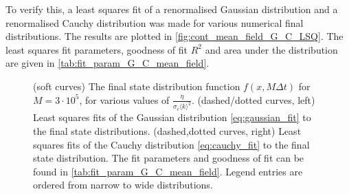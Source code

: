 To verify this, a least squares fit of a renormalised Gaussian distribution and a renormalised Cauchy distribution was made for various numerical final distributions. The results are plotted in \cref{fig:cont_mean_field_G_C_LSQ}. The least squares fit parameters, goodness of fit $R^2$ and area under the distribution are given in \cref{tab:fit_param_G_C_mean_field}. 
\begin{figure}[tbp]
	\centering
	\caption{(soft curves) The final state distribution function $f(x,M\Delta t)$ for $M=3\cdot 10^5$, for various values of $\frac{\eta}{\sigma_c\langle k \rangle^2}$. (dashed/dotted curves, left) Least squares fits of the Gaussian distribution \cref{eq:gaussian_fit} to the final state distributions. (dashed,dotted curves, right) Least squares fits of the Cauchy distribution \cref{eq:cauchy_fit} to the final state distribution. The fit parameters and goodness of fit can be found in \cref{tab:fit_param_G_C_mean_field}. Legend entries are ordered from narrow to wide distributions.}	

\end{figure}
